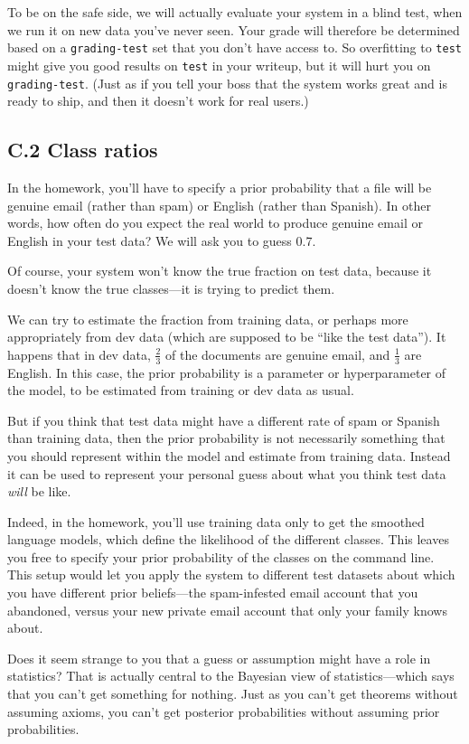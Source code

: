 \documentclass[12pt]{article}
\theoremstyle{plain}
\theoremstyle{definition}
\theoremstyle{remark}
\begin{document}
To be on the safe side, we will actually evaluate your system in a blind test, when we run it on new data you’ve never seen. Your grade will therefore be determined based on a \texttt{grading-test} set that you don’t have access to. So overfitting to \texttt{test} might give you good results on \texttt{test} in your writeup, but it will hurt you on \texttt{grading-test}. (Just as if you tell your boss that the system works great and is ready to ship, and then it doesn’t work for real users.)

\subsection*{C.2 Class ratios}
In the homework, you’ll have to specify a prior probability that a file will be genuine email (rather than spam) or English (rather than Spanish). In other words, how often do you expect the real world to produce genuine email or English in your test data? We will ask you to guess 0.7.

Of course, your system won’t know the true fraction on test data, because it doesn’t know the true classes—it is trying to predict them.

We can try to estimate the fraction from training data, or perhaps more appropriately from dev data (which are supposed to be “like the test data”). It happens that in dev data, $\tfrac{2}{3}$ of the documents are genuine email, and $\tfrac{1}{3}$ are English. In this case, the prior probability is a parameter or hyperparameter of the model, to be estimated from training or dev data as usual.

But if you think that test data might have a different rate of spam or Spanish than training data, then the prior probability is not necessarily something that you should represent within the model and estimate from training data. Instead it can be used to represent your personal guess about what you think test data \textit{will} be like.

Indeed, in the homework, you’ll use training data only to get the smoothed language models, which define the likelihood of the different classes. This leaves you free to specify your prior probability of the classes on the command line. This setup would let you apply the system to different test datasets about which you have different prior beliefs—the spam-infested email account that you abandoned, versus your new private email account that only your family knows about.

Does it seem strange to you that a guess or assumption might have a role in statistics? That is actually central to the Bayesian view of statistics—which says that you can’t get something for nothing. Just as you can’t get theorems without assuming axioms, you can’t get posterior probabilities without assuming prior probabilities.
\end{document}
